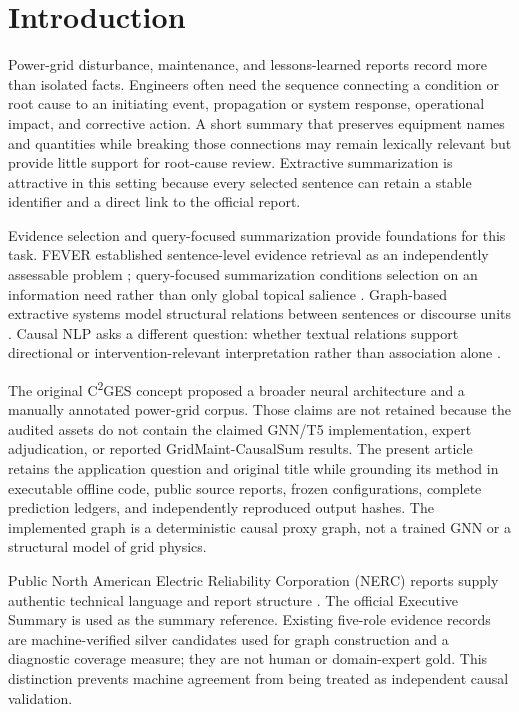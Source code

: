 \documentclass[applsci,article,submit,moreauthors]{Definitions/mdpi}
\newcommand{\cges}{C\textsuperscript{2}GES}
\begin{document}
\section{Introduction}

Power-grid disturbance, maintenance, and lessons-learned reports record more than isolated facts. Engineers often need the sequence connecting a condition or root cause to an initiating event, propagation or system response, operational impact, and corrective action. A short summary that preserves equipment names and quantities while breaking those connections may remain lexically relevant but provide little support for root-cause review. Extractive summarization is attractive in this setting because every selected sentence can retain a stable identifier and a direct link to the official report.

Evidence selection and query-focused summarization provide foundations for this task. FEVER established sentence-level evidence retrieval as an independently assessable problem \cite{thorne2018fever}; query-focused summarization conditions selection on an information need rather than only global topical salience \cite{zhong2021qmsum,vig2022exploring,zhong2020extractive}. Graph-based extractive systems model structural relations between sentences or discourse units \cite{wang2020heterogeneous,cui2020enhancing,jing2021multiplex}. Causal NLP asks a different question: whether textual relations support directional or intervention-relevant interpretation rather than association alone \cite{feder2022causal,du2022ecare}.

The original \cges{} concept proposed a broader neural architecture and a manually annotated power-grid corpus. Those claims are not retained because the audited assets do not contain the claimed GNN/T5 implementation, expert adjudication, or reported GridMaint-CausalSum results. The present article retains the application question and original title while grounding its method in executable offline code, public source reports, frozen configurations, complete prediction ledgers, and independently reproduced output hashes. The implemented graph is a deterministic causal proxy graph, not a trained GNN or a structural model of grid physics.

Public North American Electric Reliability Corporation (NERC) reports supply authentic technical language and report structure \cite{nercEventAnalysis,nerc2015qualityreport}. The official Executive Summary is used as the summary reference. Existing five-role evidence records are machine-verified silver candidates used for graph construction and a diagnostic coverage measure; they are not human or domain-expert gold. This distinction prevents machine agreement from being treated as independent causal validation.
\end{document}
